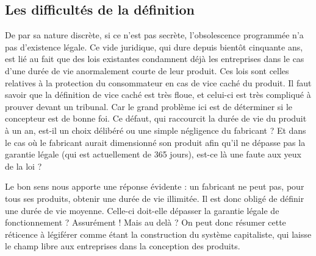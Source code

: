 \subsection{Les difficultés de la définition}

De par sa nature discrète, si ce n'est pas secrète, l'obsolescence programmée n'a pas d'existence légale. Ce vide juridique, qui dure depuis bientôt cinquante ans, est lié au fait que des lois existantes condamnent déjà les entreprises dans le cas d'une durée de vie anormalement courte de leur produit.
Ces lois sont celles relatives à la protection du consommateur en cas de vice caché du produit. Il faut savoir que la définition de vice caché est très floue, et celui-ci est très compliqué à prouver devant un tribunal.
\medbreak
Car le grand problème ici est de déterminer si le concepteur est de bonne foi. Ce défaut, qui raccourcit la durée de vie du produit à un an, est-il un choix délibéré ou une simple négligence du fabricant ? Et dans le cas où le fabricant aurait dimensionné son produit afin qu'il ne dépasse pas la garantie légale (qui est actuellement de 365 jours), est-ce là une faute aux yeux de la loi ?

Le bon sens nous apporte une réponse évidente : un fabricant ne peut pas, pour tous ses produits, obtenir une durée de vie illimitée. Il est donc obligé de définir une durée de vie moyenne. Celle-ci doit-elle dépasser la garantie légale de fonctionnement ? Assurément ! Mais au delà ?
\bigbreak
On peut donc résumer cette réticence à légiférer comme étant la construction du système capitaliste, qui laisse le champ libre aux entreprises dans la conception des produits.
